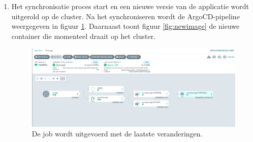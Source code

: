 \begin{enumerate}
  \begin{lstlisting}[language=bash, style=bashstyle]
    time="2023-05-09T21:42:36Z" level=info msg="Starting image update cycle, considering 1 annotated application(s) for update"
    time="2023-05-09T21:42:37Z" level=info msg="Setting new image to victorwillem/my_maven_app:v0.1.1" alias= application=my-app image_name=victorwillem/my_maven_app image_tag=v0.1.0 registry=
    time="2023-05-09T21:42:37Z" level=info msg="Successfully updated image 'victorwillem/my_maven_app:v0.1.0' to 'victorwillem/my_maven_app:v0.1.1', but pending spec update (dry run=false)" alias= application=my-app image_name=victorwillem/my_maven_app image_tag=v0.1.0 registry=
    time="2023-05-09T21:42:37Z" level=info msg="Committing 1 parameter update(s) for application my-app" application=my-app
    time="2023-05-09T21:42:37Z" level=info msg="Starting configmap/secret informers"
    time="2023-05-09T21:42:37Z" level=info msg="Configmap/secret informer synced"
    time="2023-05-09T21:42:37Z" level=info msg="secrets informer cancelled"
    time="2023-05-09T21:42:37Z" level=info msg="configmap informer cancelled"
    time="2023-05-09T21:42:37Z" level=info msg="Initializing ssh://git@GitHub.com/VictorVanhoorenHogent/testArgo CD.git to /tmp/git-my-app2029001143"
  \end{lstlisting}
  \clearpage

  \vspace{0.5cm}
  Door het toevoegen van volgende code aan de repository wordt de image overschreven met de laatste versie:
  \newline

  \begin{lstlisting}[language=yaml, style=yamlstyle]
    kustomize:
    images:
    - victorwillem/my_maven_app:v0.1.1
  \end{lstlisting}
  
  \vspace{0.5cm}
  \item Het synchronisatie proces start en een nieuwe versie van de applicatie wordt uitgerold op de cluster. Na het synchroniseren wordt de ArgoCD-pipeline weergegeven in figuur \ref{fig:newargojob}. Daarnaast toont figuur \ref{fig:newimage} de nieuwe container die momenteel draait op het cluster.
  
  \begin{figure}[H]
    \includegraphics[scale=0.38]{graphics/newcycle0.1.1.png}
  \caption{\label{fig:newargojob} De job wordt uitgevoerd met de laatste veranderingen.}
  \end{figure}


\end{enumerate}
